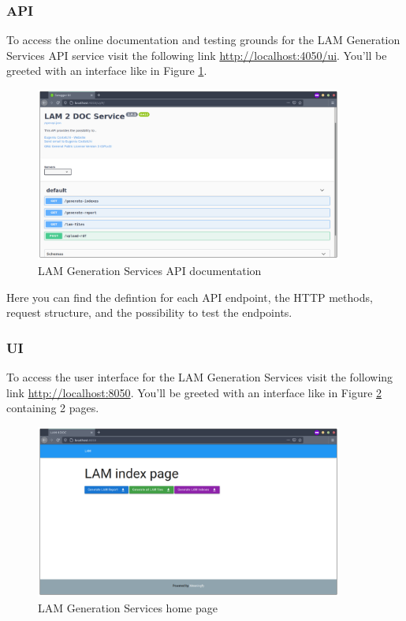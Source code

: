 \subsubsection{API}
To access the online documentation and testing grounds for the LAM Generation Services API service visit the following link \url{http://localhost:4050/ui}. You'll be greeted with an interface like in Figure \ref{fig:lam-generation-api-documentation}.

\begin{figure}[H]
  \centering
  \includegraphics[width=0.9\textwidth]{images/usage/lam-generation-api.png}
  \caption{LAM Generation Services API documentation}
  \label{fig:lam-generation-api-documentation}
\end{figure} 

Here you can find the defintion for each API endpoint, the HTTP methods, request structure, and the possibility to test the endpoints.

\subsubsection{UI}
To access the user interface for the LAM Generation Services visit the following link \url{http://localhost:8050}. You'll be greeted with an interface like in Figure \ref{fig:lam-generation-ui-home} containing 2 pages.

\begin{figure}[H]
  \centering
  \includegraphics[width=0.9\textwidth]{images/usage/lam-generation-ui-home.png}
  \caption{LAM Generation Services home page}
  \label{fig:lam-generation-ui-home}
\end{figure} 

